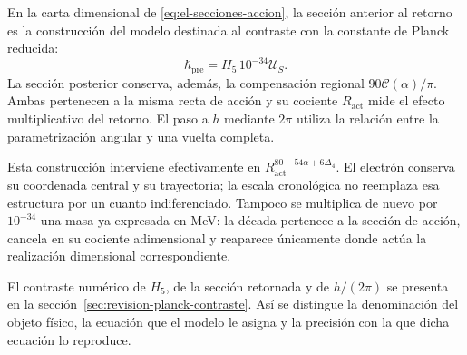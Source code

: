 En la carta dimensional de \eqref{eq:el-secciones-accion}, la sección
anterior al retorno es la construcción del modelo destinada al contraste
con la constante de Planck reducida:
\[
 \hbar_{\mathrm{pre}}=H_5\,10^{-34}\mathcal U_S.
\]
La sección posterior conserva, además, la compensación regional
\(90\mathscr C(\alpha)/\pi\). Ambas pertenecen a la misma recta de
acción y su cociente \(R_{\mathrm{act}}\) mide el efecto multiplicativo
del retorno. El paso a \(h\) mediante \(2\pi\) utiliza la relación
entre la parametrización angular y una vuelta completa.

Esta construcción interviene efectivamente en
\(R_{\mathrm{act}}^{80-54\alpha+6\Delta_4}\). El electrón conserva
su coordenada central y su trayectoria; la escala cronológica no
reemplaza esa estructura por un cuanto indiferenciado. Tampoco se
multiplica de nuevo por \(10^{-34}\) una masa ya expresada en MeV:
la década pertenece a la sección de acción, cancela en su cociente
adimensional y reaparece únicamente donde actúa la realización
dimensional correspondiente.

El contraste numérico de \(H_5\), de la sección retornada y de
\(h/(2\pi)\) se presenta en la sección~\ref{sec:revision-planck-contraste}.
Así se distingue la denominación del objeto físico, la ecuación que el
modelo le asigna y la precisión con la que dicha ecuación lo reproduce.
